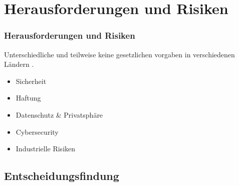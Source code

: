 
\section{Herausforderungen und Risiken}

\begin{frame}
    \frametitle{Herausforderungen und Risiken}

    Unterschiedliche und teilweise keine gesetzlichen vorgaben in verschiedenen Ländern \cite{doi:10.1080/01441647.2018.1494640}. 

    \begin{itemize}
        \item Sicherheit
        \item Haftung
        \item Datenschutz \& Privatsphäre
        \item Cybersecurity
        \item Industrielle Risiken
    \end{itemize}
\end{frame}

\subsection{Entscheidungsfindung}
